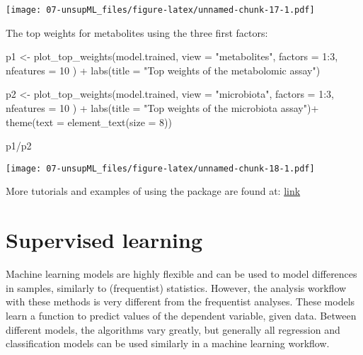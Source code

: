 \documentclass[
  oneside]{book}
\newenvironment{Shaded}{\begin{snugshade}}{\end{snugshade}}
\newcommand{\AttributeTok}[1]{\textcolor[rgb]{0.77,0.63,0.00}{#1}}
\newcommand{\DecValTok}[1]{\textcolor[rgb]{0.00,0.00,0.81}{#1}}
\newcommand{\FunctionTok}[1]{\textcolor[rgb]{0.00,0.00,0.00}{#1}}
\newcommand{\NormalTok}[1]{#1}
\newcommand{\OtherTok}[1]{\textcolor[rgb]{0.56,0.35,0.01}{#1}}
\newcommand{\SpecialCharTok}[1]{\textcolor[rgb]{0.00,0.00,0.00}{#1}}
\newcommand{\StringTok}[1]{\textcolor[rgb]{0.31,0.60,0.02}{#1}}
\begin{document}
\texttt{[image: 07-unsupML\_files/figure-latex/unnamed-chunk-17-1.pdf]}

The top weights for metabolites using the three first factors:

\begin{Shaded}
\begin{Highlighting}[]
\NormalTok{p1 }\OtherTok{\textless{}{-}} \FunctionTok{plot\_top\_weights}\NormalTok{(model.trained,}
  \AttributeTok{view =} \StringTok{"metabolites"}\NormalTok{,}
  \AttributeTok{factors =} \DecValTok{1}\SpecialCharTok{:}\DecValTok{3}\NormalTok{,}
  \AttributeTok{nfeatures =} \DecValTok{10}
\NormalTok{) }\SpecialCharTok{+} \FunctionTok{labs}\NormalTok{(}\AttributeTok{title =} \StringTok{"Top weights of the metabolomic assay"}\NormalTok{)}

\NormalTok{p2 }\OtherTok{\textless{}{-}} \FunctionTok{plot\_top\_weights}\NormalTok{(model.trained,}
  \AttributeTok{view =} \StringTok{"microbiota"}\NormalTok{,}
  \AttributeTok{factors =} \DecValTok{1}\SpecialCharTok{:}\DecValTok{3}\NormalTok{,}
  \AttributeTok{nfeatures =} \DecValTok{10}
\NormalTok{) }\SpecialCharTok{+} \FunctionTok{labs}\NormalTok{(}\AttributeTok{title =} \StringTok{"Top weights of the microbiota assay"}\NormalTok{)}\SpecialCharTok{+}
    \FunctionTok{theme}\NormalTok{(}\AttributeTok{text =} \FunctionTok{element\_text}\NormalTok{(}\AttributeTok{size =} \DecValTok{8}\NormalTok{))}

\NormalTok{p1}\SpecialCharTok{/}\NormalTok{p2}
\end{Highlighting}
\end{Shaded}

\texttt{[image: 07-unsupML\_files/figure-latex/unnamed-chunk-18-1.pdf]}

More tutorials and examples of using the package are found at: \href{https://biofam.github.io/MOFA2/tutorials.html}{link}

\hypertarget{supervised-learning}{%
\chapter{Supervised learning}\label{supervised-learning}}

Machine learning models are highly flexible and can be used to model differences in
samples, similarly to (frequentist) statistics. However, the analysis workflow with
these methods is very different from the frequentist analyses. These models learn
a function to predict values of the dependent variable, given data. Between different
models, the algorithms vary greatly, but generally all regression and classification
models can be used similarly in a machine learning workflow.
\end{document}
